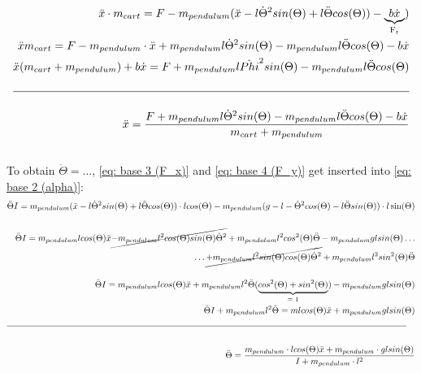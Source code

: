     \begin{align}\label{eq: final eq for x ddot}
        \ddot{x} \cdot m_{cart} = F-m_{pendulum}(\ddot{x}-l\dot{\Theta}^2 sin(\Theta)+l \ddot{\Theta} cos (\Theta))-\underbrace{b\dot{x}}_\text{F\textsubscript{r}})\notag \\
         \ddot{x} m_{cart} = F-m_{pendulum}\cdot\ddot{x}+m_{pendulum}l\dot{\Theta}^2 sin(\Theta)-m_{pendulum}l\ddot{\Theta}cos(\Theta)-b\dot{x}\notag \\
         \ddot{x}(m_{cart}+m_{pendulum})+b\dot{x}=F+m_{pendulum}l\dot{Phi}^2 sin(\Theta)-m_{pendulum}l\ddot{\Theta}cos(\Theta)\notag \\\notag \\\hline \notag \\
         \ddot{x} = \frac{F+m_{pendulum}l\dot{\Theta}^2 sin(\Theta)-m_{pendulum}l\ddot{\Theta}cos(\Theta)-b\dot{x}}{m_{cart}+m_{pendulum}}
    \end{align}
    \\
    To obtain $\ddot{\Theta} = \dots$, \autoref{eq: base 3 (F_x)} and \autoref{eq: base 4 (F_y)} get inserted into \autoref{eq: base 2 (alpha)}:
    \begin{align} \label{eq: final eq for Phi ddot}
        \ddot{\Theta} I = m_{pendulum} (\ddot{x} - l\dot{\Theta}^2 sin(\Theta) + l\ddot{\Theta} cos(\Theta))\cdot lcos(\Theta)-m_{pendulum}(g-l-\dot{\Theta}^2 cos(\Theta)-l\ddot{\Theta}sin(\Theta))\cdot l\sin(\Theta)\notag \\\notag\\
        \ddot{\Theta} I = m_{pendulum} l cos(\Theta) \ddot{x} \cancel{- m_{pendulum} l^2 cos(\Theta) sin(\Theta) \dot{\Theta}^2} + m_{pendulum} l^2 cos^2(\Theta) \ddot{\Theta} - m_{pendulum}g l sin(\Theta) \dots \notag\\ \dots \cancel{+m_{pendulum}l^2 sin(\Theta)cos(\Theta)\dot{\Theta}^2}+m_{pendulum}l^2 sin^2(\Theta)\ddot{\Theta}\notag \\\notag \\
        \ddot{\Theta} I = m_{pendulum} l cos(\Theta) \ddot{x} + m_{pendulum} l^2 \ddot{\Theta} (\underbrace{cos^2(\Theta)+sin^2(\Theta)}_\text{= 1})-m_{pendulum} g l sin(\Theta)\notag \\
         \ddot{\Theta} I + m_{pendulum}l^2\ddot{\Theta} = m l cos(\Theta)\ddot{x} + m_{pendulum} g l sin(\Theta)\notag \\\cline{1-2}\notag \\
         \ddot{\Theta} = \frac{m_{pendulum}\cdot lcos(\Theta)\ddot{x}+m_{pendulum}\cdot glsin(\Theta)}{I+m_{pendulum}\cdot l^2}
    \end{align}

